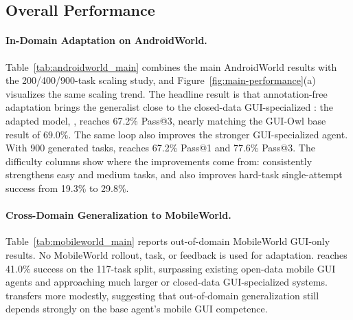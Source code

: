 \setcounter{insight}{0}



\subsection{Overall Performance}
\label{sec:results}


\paragraph{In-Domain Adaptation on AndroidWorld.}
Table~\ref{tab:androidworld_main} combines the main AndroidWorld results with the 200/400/900-task scaling study, and Figure~\ref{fig:main-performance}(a) visualizes the same scaling trend. The headline result is that annotation-free adaptation brings the generalist  close to the closed-data GUI-specialized : the adapted model, , reaches 67.2\% Pass@3, nearly matching the GUI-Owl base result of 69.0\%. The same loop also improves the stronger GUI-specialized agent. With 900 generated tasks,  reaches 67.2\% Pass@1 and 77.6\% Pass@3. The difficulty columns show where the improvements come from: \ourmethod consistently strengthens easy and medium tasks, and  also improves hard-task single-attempt success from 19.3\% to 29.8\%.



\paragraph{Cross-Domain Generalization to MobileWorld.}
Table~\ref{tab:mobileworld_main} reports out-of-domain MobileWorld GUI-only results. No MobileWorld rollout, task, or feedback is used for adaptation.  reaches 41.0\% success on the 117-task split, surpassing existing open-data mobile GUI agents and approaching much larger or closed-data GUI-specialized systems.  transfers more modestly, suggesting that out-of-domain generalization still depends strongly on the base agent's mobile GUI competence.




